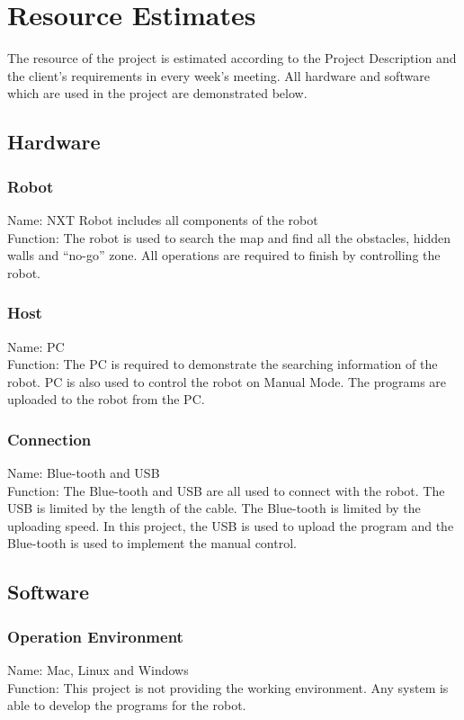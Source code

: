 \documentclass[11pt, a4paper]{report}
\begin{document}
\pagebreak




\chapter{Resource Estimates} %
\label{cha:RE}
The resource of the project is estimated according to the Project Description and the client's requirements in every week's meeting. All hardware and software which are used in the project are demonstrated below.
\section{Hardware}
\subsection{Robot}
Name: NXT Robot includes all components of the robot\\
Function: The robot is used to search the map and find all the obstacles, hidden walls and ``no-go'' zone. All operations are required to finish by controlling the robot.
\subsection{Host}
Name: PC\\
Function: The PC is required to demonstrate the searching information of the robot. PC is also used to control the robot on Manual Mode. The programs are uploaded to the robot from the PC.
\subsection{Connection}
Name: Blue-tooth and USB \\
Function: The Blue-tooth and USB are all used to connect with the robot. The USB is limited by the length of the cable. The Blue-tooth is limited by the uploading speed. In this project, the USB is used to upload the program and the Blue-tooth is used to implement the manual control.
\section{Software}
\subsection{Operation Environment}
Name: Mac, Linux and Windows\\
Function: This project is not providing the working environment. Any system is able to develop the programs for the robot.
\end{document}

